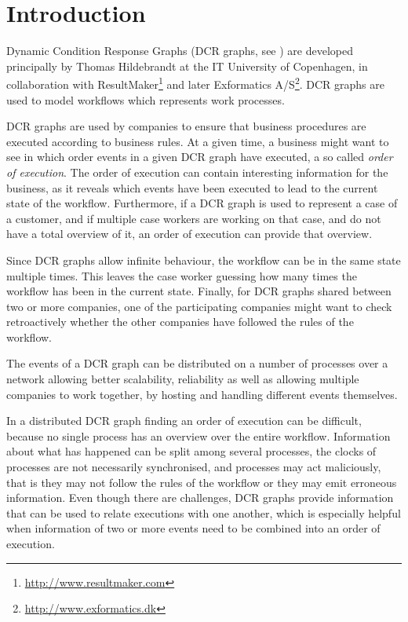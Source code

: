 \chapter{Introduction}
	Dynamic Condition Response Graphs (DCR graphs, see \cite{hildebrandt2011declarative}) are developed principally by Thomas Hildebrandt at the IT University of Copenhagen, in collaboration with ResultMaker\footnote{\url{http://www.resultmaker.com}} and later Exformatics A/S\footnote{\url{http://www.exformatics.dk}}. DCR graphs are used to model workflows which represents work processes.
	
	\newpar DCR graphs are used by companies to ensure that business procedures are executed according to business rules. At a given time, a business might want to see in which order events in a given DCR graph have executed, a so called \textit{order of execution}. The order of execution can contain interesting information for the business, as it reveals which events have been executed to lead to the current state of the workflow. Furthermore, if a DCR graph is used to represent a case of a customer, and if multiple case workers are working on that case, and do not have a total overview of it, an order of execution can provide that overview.
	
	Since DCR graphs allow infinite behaviour, the workflow can be in the same state multiple times. This leaves the case worker guessing how many times the workflow has been in the current state. Finally, for DCR graphs shared between two or more companies, one of the participating companies might want to check retroactively whether the other companies have followed the rules of the workflow.
	
	\newpar The events of a DCR graph can be distributed on a number of processes over a network allowing better scalability, reliability as well as allowing multiple companies to work together, by hosting and handling different events themselves.
	
	\newpar In a distributed DCR graph finding an order of execution can be difficult, because no single process has an overview over the entire workflow. Information about what has happened can be split among several processes, the clocks of processes are not necessarily synchronised, and processes may act maliciously, that is they may not follow the rules of the workflow or they may emit erroneous information. Even though there are challenges, DCR graphs provide information that can be used to relate executions with one another, which is especially helpful when information of two or more events need to be combined into an order of execution. 
	
